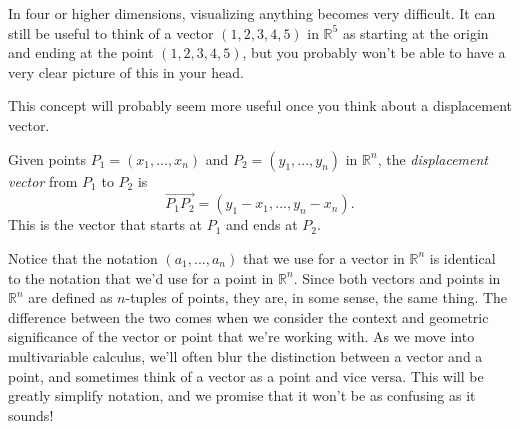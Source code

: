 \documentclass{ximera}
\begin{document}
\begin{image}
\end{image}

In four or higher dimensions, visualizing anything becomes very difficult. It can still be useful to think of a vector $(1,2,3,4,5)$ in $\mathbb{R}^5$ as starting at the origin and ending at the point $(1,2,3,4,5)$, but you probably won't be able to have a very clear picture of this in your head.

This concept will probably seem more useful once you think about a displacement vector.

\begin{definition}
Given points $P_1 = (x_1,...,x_n)$ and $P_2 = (y_1,...,y_n)$ in $\mathbb{R}^n$, the \emph{displacement vector} from $P_1$ to $P_2$ is
\[
\vec{P_1P_2} = (y_1 - x_1,..., y_n - x_n).
\]
This is the vector that starts at $P_1$ and ends at $P_2$.
\end{definition}

Notice that the notation $(a_1,...,a_n)$ that we use for a vector in $\mathbb{R}^n$ is identical to the notation that we'd use for a point in $\mathbb{R}^n$. Since both vectors and points in $\mathbb{R}^n$ are defined as $n$-tuples of points, they are, in some sense, the same thing. The difference between the two comes when we consider the context and geometric significance of the vector or point that we're working with. As we move into multivariable calculus, we'll often blur the distinction between a vector and a point, and sometimes think of a vector as a point and vice versa. This will be greatly simplify notation, and we promise that it won't be as confusing as it sounds!
\end{document}
